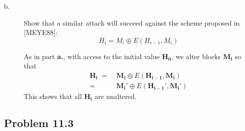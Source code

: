 \documentclass[../hw_sols.tex]{subfiles}
\begin{document}
\begin{description}
\begin{solution}
\end{solution}

\item[b.] Show that a similar attack will succeed against the scheme proposed 
in [MEYE88]:
	\[ H_i = M_i \oplus E(H_{i-1}, M_i) \]

\begin{solution}
As in part \textbf{a.}, with access to the initial value $\mathbf{H_0}$, we 
alter blocks $\mathbf{M_i}$ so that
\begin{align*}
	\mathbf{H_i} \; 
	=& \; \mathbf{M_i} \oplus E(\mathbf{H_{i-1}}, \mathbf{M_i}) \\
	=& \; \mathbf{M_i}' \oplus E(\mathbf{H_{i-1}}', \mathbf{M_i}')
\end{align*}
This shows that all $\mathbf{H_i}$ are unaltered.
\end{solution}

\end{description}


\newpage



\subsection*{Problem 11.3}
\end{document}
